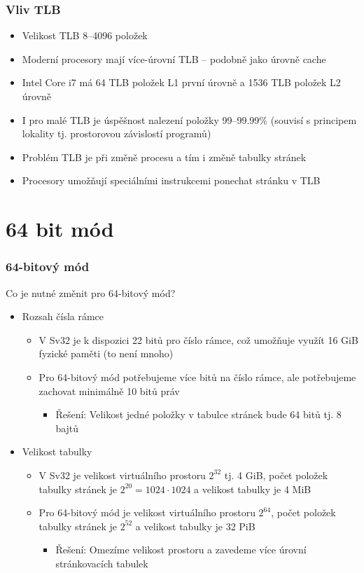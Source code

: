 \documentclass[aspectratio=169]{beamer}
\begin{document}
\begin{frame}
\frametitle{Vliv TLB}
\begin{itemize}
\item Velikost TLB 8--4096 položek
\item Moderní procesory mají více-úrovní TLB – podobně jako úrovně cache
\item Intel Core i7 má 64 TLB položek L1 první úrovně a 1536 TLB položek L2 úrovně
\item I pro malé TLB je úspěšnost nalezení položky 99--99.99\% (souvisí s principem lokality tj. prostorovou závislostí programů)
\item Problém TLB je při změně procesu a tím i změně tabulky stránek
\item Procesory umožňují speciálními instrukcemi ponechat stránku v TLB
\end{itemize}
\end{frame}

\section{64 bit mód}

\begin{frame}
\frametitle{64-bitový mód}

Co je nutné změnit pro 64-bitový mód?
\begin{itemize}
\item Rozsah čísla rámce
\begin{itemize}
\item V Sv32 je k dispozici 22 bitů pro číslo rámce, což umožňuje využít 16 GiB fyzické paměti (to není mnoho)
\item Pro 64-bitový mód potřebujeme více bitů na číslo rámce, ale potřebujeme zachovat minimálně 10 bitů práv
\begin{itemize}
\item Řešení: Velikost jedné položky v tabulce stránek bude 64 bitů tj. 8 bajtů
\end{itemize}
\end{itemize}
\item Velikost tabulky
\begin{itemize}
\item V Sv32 je velikost virtuálního prostoru $2^{32}$ tj. 4 GiB, počet položek tabulky stránek je $2^{20} = 1024 \cdot 1024$ a velikost tabulky je 4 MiB
\item Pro 64-bitový mód je velikost virtuálního prostoru $2^{64}$, počet položek tabulky stránek je $2^{52}$ a velikost tabulky je 32 PiB
\begin{itemize}
\item Řešení: Omezíme velikost prostoru a zavedeme více úrovní stránkovacích tabulek
\end{itemize}
\end{itemize}
\end{itemize}
\end{frame}
\end{document}
